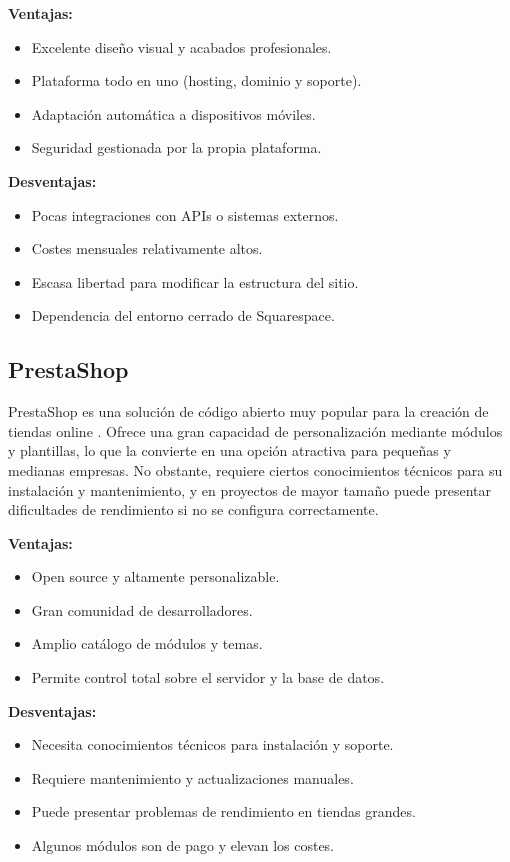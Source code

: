 \textbf{Ventajas:}
\begin{itemize}
    \item Excelente diseño visual y acabados profesionales.
    \item Plataforma todo en uno (hosting, dominio y soporte).
    \item Adaptación automática a dispositivos móviles.
    \item Seguridad gestionada por la propia plataforma.
\end{itemize}

\textbf{Desventajas:}
\begin{itemize}
    \item Pocas integraciones con APIs o sistemas externos.
    \item Costes mensuales relativamente altos.
    \item Escasa libertad para modificar la estructura del sitio.
    \item Dependencia del entorno cerrado de Squarespace.
\end{itemize}

\subsection{PrestaShop}
PrestaShop es una solución de código abierto muy popular para la creación de tiendas
online \cite{prestashopDocs}. Ofrece una gran capacidad de personalización mediante módulos y plantillas, lo que la convierte en una opción atractiva para pequeñas y medianas empresas. No obstante, requiere ciertos conocimientos técnicos para su instalación y mantenimiento, y en proyectos de mayor tamaño puede presentar dificultades de rendimiento si no se configura correctamente.

\textbf{Ventajas:}
\begin{itemize}
    \item Open source y altamente personalizable.
    \item Gran comunidad de desarrolladores.
    \item Amplio catálogo de módulos y temas.
    \item Permite control total sobre el servidor y la base de datos.
\end{itemize}

\textbf{Desventajas:}
\begin{itemize}
    \item Necesita conocimientos técnicos para instalación y soporte.
    \item Requiere mantenimiento y actualizaciones manuales.
    \item Puede presentar problemas de rendimiento en tiendas grandes.
    \item Algunos módulos son de pago y elevan los costes.
\end{itemize}


